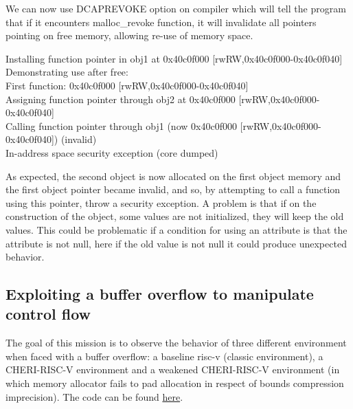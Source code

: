 \documentclass[a4paper, 11pt]{article}
\begin{document}
		We can now use DCAPREVOKE option on compiler which will tell the program that if it encounters malloc\_revoke function, it will invalidate all pointers pointing on free memory, allowing re-use of memory space.
		\begin{tcolorbox}[colback=gray!5!white, colframe=purple!75!black, title=Output on CHERI protected environment \& CAPREVOKE compiler option active]
			Installing function pointer in obj1 at 0x40c0f000 [rwRW,0x40c0f000-0x40c0f040]\\
			Demonstrating use after free:\\
			First function: 0x40c0f000 [rwRW,0x40c0f000-0x40c0f040]\\
			Assigning function pointer through obj2 at 0x40c0f000 [rwRW,0x40c0f000-0x40c0f040]\\
			Calling function pointer through obj1 (now 0x40c0f000  [rwRW,0x40c0f000-0x40c0f040]) (invalid)\\
			In-address space security exception (core dumped)
		\end{tcolorbox}
		As expected, the second object is now allocated on the first object memory and the first object pointer became invalid, and so, by attempting to call a function using this pointer, throw a security exception.
		A problem is that if on the construction of the object, some values are not initialized, they will keep the old values.
		This could be problematic if a condition for using an attribute is that the attribute is not null, here if the old value is not null it could produce unexpected behavior.
	

	\subsection{Exploiting a buffer overflow to manipulate control flow}
		The goal of this mission is to observe the behavior of three different environment when faced with a buffer overflow: a baseline \Gls{risc-v} (classic environment), a CHERI-RISC-V environment and a weakened CHERI-RISC-V environment (in which memory allocator fails to pad allocation in respect of bounds compression imprecision).
		The code can be found \href{https://ctsrd-cheri.github.io/cheri-exercises/missions/buffer-overflow-control-flow/index.html}{here}.
		
\end{document}
